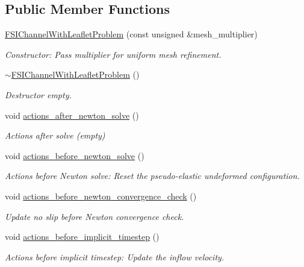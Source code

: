 \subsection*{Public Member Functions}
\begin{DoxyCompactItemize}
\item 
\hyperlink{classFSIChannelWithLeafletProblem_a886599acf388d3ad5a2ec8c418c77280}{F\+S\+I\+Channel\+With\+Leaflet\+Problem} (const unsigned \&mesh\+\_\+multiplier)
\begin{DoxyCompactList}\small\item\em Constructor\+: Pass multiplier for uniform mesh refinement. \end{DoxyCompactList}\item 
\hyperlink{classFSIChannelWithLeafletProblem_a5df1d8f7229314a92ffb48ec61f56fe0}{$\sim$\+F\+S\+I\+Channel\+With\+Leaflet\+Problem} ()
\begin{DoxyCompactList}\small\item\em Destructor empty. \end{DoxyCompactList}\item 
void \hyperlink{classFSIChannelWithLeafletProblem_abff6e46a940263c9255a61f649bb4239}{actions\+\_\+after\+\_\+newton\+\_\+solve} ()
\begin{DoxyCompactList}\small\item\em Actions after solve (empty) \end{DoxyCompactList}\item 
void \hyperlink{classFSIChannelWithLeafletProblem_a8a32ef77f32b3283b4b509669deb0a11}{actions\+\_\+before\+\_\+newton\+\_\+solve} ()
\begin{DoxyCompactList}\small\item\em Actions before Newton solve\+: Reset the pseudo-\/elastic undeformed configuration. \end{DoxyCompactList}\item 
void \hyperlink{classFSIChannelWithLeafletProblem_aff02228eddae18ef3d57306ba1e61495}{actions\+\_\+before\+\_\+newton\+\_\+convergence\+\_\+check} ()
\begin{DoxyCompactList}\small\item\em Update no slip before Newton convergence check. \end{DoxyCompactList}\item 
void \hyperlink{classFSIChannelWithLeafletProblem_ac73220fa534cf2409bb0ebcf2fb5e1d5}{actions\+\_\+before\+\_\+implicit\+\_\+timestep} ()
\begin{DoxyCompactList}\small\item\em Actions before implicit timestep\+: Update the inflow velocity. \end{DoxyCompactList}\item 

\end{DoxyCompactItemize}
